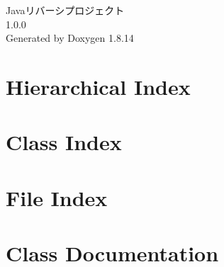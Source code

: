 \documentclass[twoside]{book}
\newcommand{\+}{\discretionary{\mbox{\scriptsize$\hookleftarrow$}}{}{}}
\newcommand{\clearemptydoublepage}{%
  \newpage{\pagestyle{empty}\cleardoublepage}%
}
\begin{document}
\hypersetup{pageanchor=false,
             bookmarksnumbered=true,
             pdfencoding=unicode
            }
\begin{titlepage}
\vspace*{7cm}
\begin{center}%
{\Large Javaリバーシプロジェクト \\[1ex]\large 1.\+0.\+0 }\\
\vspace*{1cm}
{\large Generated by Doxygen 1.8.14}\\
\end{center}
\end{titlepage}
\clearemptydoublepage
{}
\tableofcontents
\clearemptydoublepage
{}
\hypersetup{pageanchor=true}

\chapter{Hierarchical Index}

\chapter{Class Index}

\chapter{File Index}

\chapter{Class Documentation}













\end{document}
